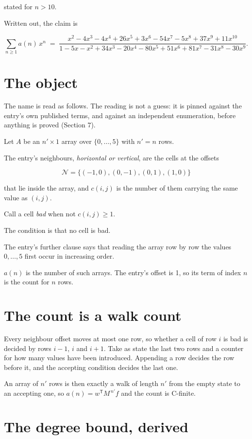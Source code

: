 \documentclass[11pt]{article}
\theoremstyle{definition}
\begin{document}
stated for $n > 10$.

Written out, the claim is

\[\sum_{n \ge 1} a(n)\,x^n \;=\; \frac{x^{2} - 4x^{3} - 4x^{4} + 26x^{5} + 3x^{6} - 54x^{7} - 5x^{8} + 37x^{9} + 11x^{10}}{1 - 5x - x^{2} + 34x^{3} - 20x^{4} - 80x^{5} + 51x^{6} + 81x^{7} - 31x^{8} - 30x^{9}}.\]

\section{The object}

The name is read as follows. The reading is not a guess: it is pinned against the entry's own published terms, and against an independent enumeration, before anything is proved (Section 7).

Let $A$ be an $n' \times 1$ array over $\{0,\dots,5\}$ with $n' = n$ rows.

The entry's neighbours, {\itshape horizontal or vertical}, are the cells at the offsets

\[\mathcal{N} = \{(-1,0), (0,-1), (0,1), (1,0)\}\]

that lie inside the array, and $c(i,j)$ is the number of them carrying the same value as $(i,j)$.

Call a cell {\itshape bad} when not $c(i,j) \ge 1$.

The condition is that no cell is bad.

The entry's further clause says that reading the array row by row the values $0,\dots,5$ first occur in increasing order.

$a(n)$ is the number of such arrays. The entry's offset is 1, so its term of index $n$ is the count for $n$ rows.

\section{The count is a walk count}

Every neighbour offset moves at most one row, so whether a cell of row $i$ is bad is decided by rows $i-1$, $i$ and $i+1$. Take as state the last two rows and a counter for how many values have been introduced. Appending a row decides the row before it, and the accepting condition decides the last one.

An array of $n'$ rows is then exactly a walk of length $n'$ from the empty state to an accepting one, so $a(n) = w^{\mathsf T}M^{\,n'}f$ and the count is C-finite.

\section{The degree bound, derived}
\end{document}

